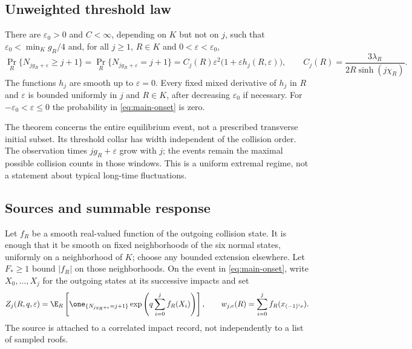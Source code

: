 \subsection{Unweighted threshold law}
\begin{theorem}\label{thm:unweighted}
There are $\varepsilon_0>0$ and $C<\infty$, depending on $K$ but not on
$j$, such that $\varepsilon_0<\min_K g_R/4$ and, for all $j\ge1$,
$R\in K$ and $0<\varepsilon<\varepsilon_0$,
\begin{equation}\label{eq:main-onset}
 \Pr_R\{N_{jg_R+\varepsilon}\ge j+1\}
 =\Pr_R\{N_{jg_R+\varepsilon}=j+1\}
 =C_j(R)\varepsilon^2\bigl(1+\varepsilon h_j(R,\varepsilon)\bigr),
 \qquad C_j(R)=\frac{3\lambda_R}{2R\sinh(j\chi_R)}.
\end{equation}
The functions $h_j$ are smooth up to $\varepsilon=0$. Every fixed
mixed derivative of $h_j$ in $R$ and $\varepsilon$ is bounded uniformly
in $j$ and $R\in K$, after decreasing $\varepsilon_0$ if necessary.
For $-\varepsilon_0<\varepsilon\le0$ the probability in
\eqref{eq:main-onset} is zero.
\end{theorem}

The theorem concerns the entire equilibrium event, not a prescribed
transverse initial subset. Its threshold collar has width independent
of the collision order. The observation times $jg_R+\varepsilon$ grow
with $j$; the events remain the maximal possible collision counts in
those windows. This is a uniform extremal regime, not a statement about
typical long-time fluctuations.

\subsection{Sources and summable response}
Let $f_R$ be a smooth real-valued function of the outgoing collision
state. It is enough that it be smooth on fixed neighborhoods of the six
normal states, uniformly on a neighborhood of $K$; choose any bounded
extension elsewhere. Let $F_*\ge1$ bound $|f_R|$ on those neighborhoods.
On the event in \eqref{eq:main-onset}, write $X_0,\ldots,X_j$ for the
outgoing states at its successive impacts and set
\[
 Z_j(R,q,\varepsilon)=
 \E_R\left[\one_{\{N_{jg_R+\varepsilon}=j+1\}}
             \exp\left(q\sum_{i=0}^j f_R(X_i)\right)\right],
 \qquad
 w_{j,e}(R)=\sum_{i=0}^j f_R(x_{(-1)^i e}).
\]
The source is attached to a correlated impact record, not independently
to a list of sampled roofs.

